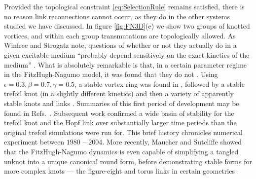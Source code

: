 Provided the topological constraint \ref{eq:SelectionRule} remains satisfied, there is no reason link reconnections cannot occur, as they do in the other systems studied we have discussed. In figure \ref{fig:FN3D}(e) we show two groups of knotted vortices, and within each group transmutations are topologically allowed. As Winfree and Strogatz note, questions of whether or not they actually do in a given excitable medium ``probably depend sensitively on the exact kinetics of the medium'' \cite{Winfree4}. What is absolutely remarkable is that, in a certain parameter regime in the FitzHugh-Nagumo model, it was found that they do not \cite{WinfreeReview,HenzeThesis}. Using $\epsilon = 0.3, \beta = 0.7, \gamma=0.5$, a stable vortex ring was found in \cite{Courtemarche}, followed by a stable trefoil knot \cite{}(in a slightly different kinetics) and then a variety of apparently stable knots and links \cite{HenzeThesis}. Summaries of this first period of development may be found in Refs.~\cite{WinfreeReview,WinfreeBook}. Subsequent work \cite{Sutcliffe} confirmed a wide basin of stability for the trefoil knot and the Hopf link over substantially larger time periods than the original trefoil simulations were run for. This brief history chronicles numerical experiment between $1980$ -- $2004$.  More recently, Maucher and Sutcliffe \cite{} showed that the FitzHugh-Nagumo dynamics is even capable of simplifying a tangled unknot into a unique canonical round form, before demonstrating stable forms for more complex knots --- the figure-eight and torus links in certain geometries \cite{}.   

% 

